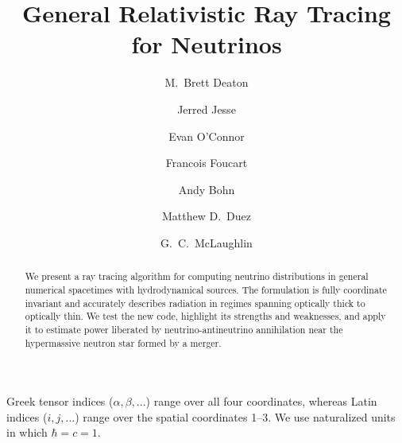 \documentclass[aps,prd,twocolumn,superscriptaddress,groupedaddress]{revtex4}
\begin{document}
\widetext
{}

\title{General Relativistic Ray Tracing for Neutrinos}

\author{M.\ Brett Deaton}

\author{Jerred Jesse}

\author{Evan O'Connor}

\author{Francois Foucart}

\author{Andy Bohn}

\author{Matthew D.\ Duez}

\author{G.\ C.\ McLaughlin}


\begin{abstract}
  We present a ray tracing algorithm for computing neutrino distributions in
  general numerical spacetimes with hydrodynamical sources.
  The formulation is fully coordinate invariant and accurately describes
  radiation in regimes spanning optically thick to optically thin.
  We test the new code, highlight its strengths and weaknesses, and
  apply it to estimate power
  liberated by neutrino-antineutrino annihilation near the hypermassive neutron
  star formed by a merger.
\end{abstract}

\maketitle

Greek tensor indices ($\alpha, \beta, ...$) range over all four coordinates,
whereas Latin indices ($i, j, ...$) range over the spatial coordinates 1--3.
We use naturalized units in which $\hbar=c=1$.
\end{document}
